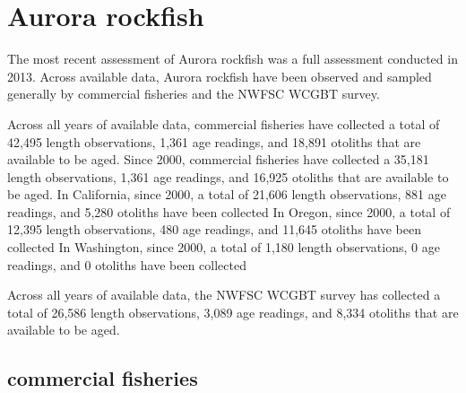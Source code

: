 \documentclass[11pt,
  english,
  letterpaper,
]{article}
\begin{document}

\hypertarget{aurora-rockfish}{%
\section{Aurora rockfish}\label{aurora-rockfish}}

\leavevmode\tagmcend\tagstructend


The most recent assessment of Aurora rockfish was a full assessment conducted in 2013. Across available data, Aurora rockfish have been observed and sampled generally by commercial fisheries and the NWFSC WCGBT survey.

\leavevmode\tagmcend\tagstructend\par


Across all years of available data, commercial fisheries have collected a total of 42,495 length observations, 1,361 age readings, and 18,891 otoliths that are available to be aged. Since 2000, commercial fisheries have collected a 35,181 length observations, 1,361 age readings, and 16,925 otoliths that are available to be aged. In California, since 2000, a total of 21,606 length observations, 881 age readings, and 5,280 otoliths have been collected In Oregon, since 2000, a total of 12,395 length observations, 480 age readings, and 11,645 otoliths have been collected In Washington, since 2000, a total of 1,180 length observations, 0 age readings, and 0 otoliths have been collected

\leavevmode\tagmcend\tagstructend\par


Across all years of available data, the NWFSC WCGBT survey has collected a total of 26,586 length observations, 3,089 age readings, and 8,334 otoliths that are available to be aged.

\leavevmode\tagmcend\tagstructend\par


\hypertarget{commercial-fisheries-1}{%
\subsection{commercial fisheries}\label{commercial-fisheries-1}}
\end{document}
